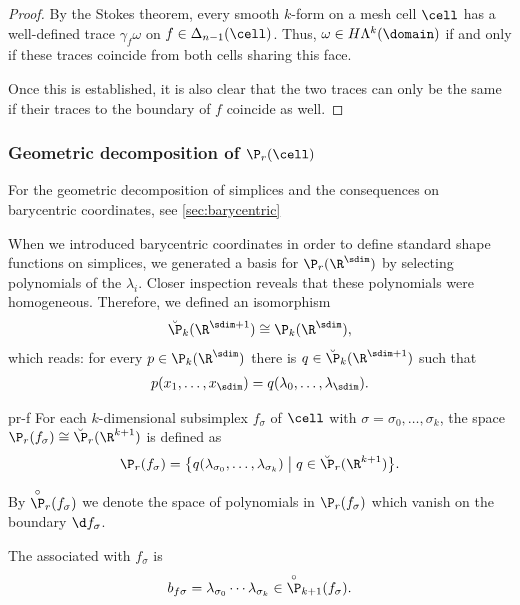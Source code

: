 \begin{proof}
  By the Stokes theorem, every smooth $k$-form on a mesh cell $\cell$
  has a well-defined trace $\gamma_f\omega$ on
  $f\in\Delta_{n-1}(\cell)$. Thus, $\omega\in H\Lambda^k(\domain)$ if
  and only if these traces coincide from both cells sharing this face.

  Once this is established, it is also clear that the two traces can
  only be the same if their traces to the boundary of $f$ coincide as
  well.
\end{proof}

\subsubsection{Geometric decomposition of $\P_r(\cell)$}

For the geometric decomposition of simplices and the consequences on barycentric coordinates, see \cref{sec:barycentric}

\begin{remark}
  When we introduced barycentric coordinates in order to define
  standard shape functions on simplices, we generated a basis for
  $\P_r(\R^\sdim)$ by selecting polynomials of the $\lambda_i$. Closer
  inspection reveals that these polynomials were
  homogeneous. Therefore, we defined an isomorphism
  \begin{gather}
    \breve \P_k(\R^{\sdim+1}) \cong \P_k(\R^\sdim),
  \end{gather}
  which reads: for every $p\in \P_k(\R^\sdim)$ there is
  $q\in\breve\P_k(\R^{\sdim+1})$ such that
  \begin{gather}
    p(x_1,\dots,x_\sdim) = q(\lambda_0,\dots,\lambda_\sdim).
  \end{gather}
\end{remark}

\begin{Definition}{pr-f}
  For each $k$-dimensional subsimplex $f_\sigma$ of $\cell$ with
  $\sigma = \sigma_0,\dots,\sigma_k$, the space
  $\P_r(f_\sigma) \cong \breve\P_r(\R^{k+1})$ is defined as
  \begin{gather}
    \P_r(f_\sigma) = \bigl\{
    q(\lambda_{\sigma_0},\dots,\lambda_{\sigma_k})
    \;\big\vert\;
    q\in\breve \P_r(\R^{k+1})\bigr\}.
  \end{gather}
  
  By $\overset{\circ}{\P}_r(f_\sigma)$ we denote the space of
  polynomials in $\P_r(f_\sigma)$ which vanish on the boundary $\d f_\sigma$.

  The  associated with $f_\sigma$ is
  \begin{gather}
    b_{f\sigma} = \lambda_{\sigma_0}\cdots\lambda_{\sigma_k}
    \in \overset{\circ}{\P}_{k+1}(f_\sigma).
  \end{gather}
\end{Definition}

